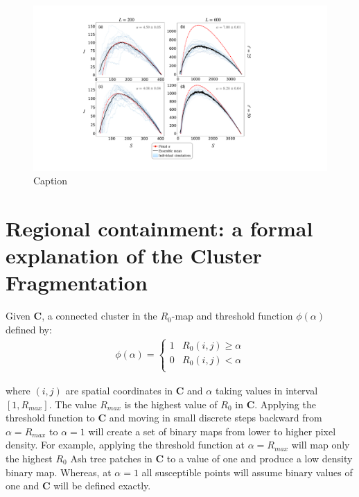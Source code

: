 \begin{figure}
    \centering
    \includegraphics[scale=0.4]{chapter5/figures/fig2-sir-fitting-exp.pdf}
    \caption{Caption}
    \label{fig:SIR-fitting-expontial}
\end{figure}


\chapter{Regional containment: a formal explanation of the Cluster Fragmentation}
\label{section:alpha-step}
Given $\mathbf{C}$, a connected cluster in the $R_0$-map and threshold function $\phi(\alpha)$ defined by:
\begin{align}
\label{eq:alpha-step}
\phi(\alpha) = \left\{ \begin{array}{cc} 
                1 & R_0(i, j) \geq \alpha \\
                0 & R_0(i, j) < \alpha \\
                \end{array} \right.
\end{align}

where $(i,j)$ are spatial coordinates in $\mathbf{C}$ and $\alpha$ taking values in interval $[1, R_{max}]$. The value $R_{max}$ is the highest value of $R_0$ in $\mathbf{C}$. Applying the threshold function to $\mathbf{C}$ and moving in small discrete steps backward from $\alpha = R_{max}$ to $\alpha=1$ will create a set of binary maps from lower to higher pixel density. For example, applying the threshold function at $\alpha = R_{max}$ will map only the highest $R_0$ Ash tree patches in $\mathbf{C}$ to a value of one and produce a low density binary map. Whereas, at $\alpha=1$ all susceptible points will assume binary values of one and $\mathbf{C}$ will be defined exactly.\\

